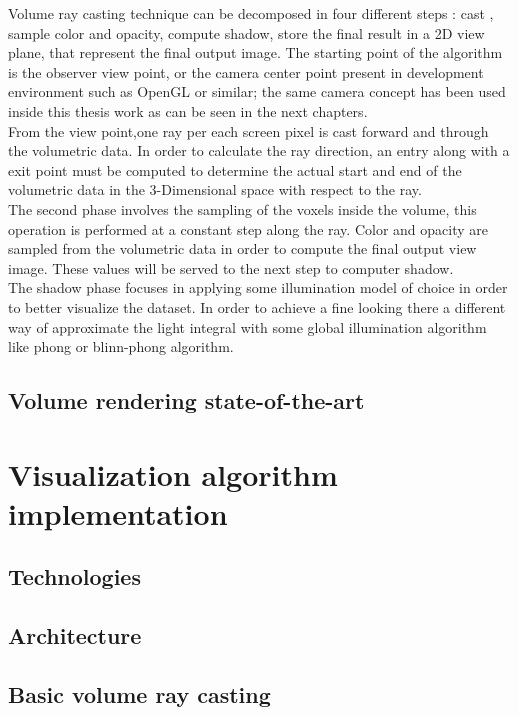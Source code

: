 \documentclass[10pt,a4paper]{article}
\begin{document}
Volume ray casting technique can be decomposed in four different steps %
: cast , sample color and opacity, compute shadow, store the final result in a 2D view plane, that represent the final output image.
The starting point of the algorithm is the observer view point, or the camera center point present in development environment such as OpenGL or similar; the same camera concept has been used inside this thesis work as can be seen in the next chapters.\\

From the view point,one ray per each screen pixel is cast forward and through the volumetric data.
In order to calculate the ray direction, an entry along with a exit point must be computed to determine the actual start and end of the volumetric data in the 3-Dimensional space with respect to the ray.\\

The second phase involves the sampling of the voxels inside the volume, this operation is performed at a constant step along the ray. Color and opacity are sampled from the volumetric data in order to compute the final output view image. These values will be served to the next step to computer shadow.\\

The shadow phase focuses in applying some illumination model of choice in order to better visualize the dataset. In order to achieve a fine looking there a different way of approximate the light integral with some global illumination algorithm like phong or blinn-phong algorithm.


\subsection{Volume rendering state-of-the-art} %
\section{Visualization algorithm implementation} 
\subsection{Technologies} %
\subsection{Architecture} %
\subsection{Basic volume ray casting} %
\end{document}
